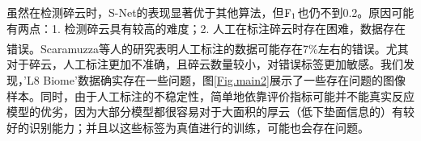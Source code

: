 \documentclass[10pt,UTF8,fntef]{ctexart}
\newcommand{\upcite}[1]{\textsuperscript{\textsuperscript{\cite{#1}}}}
\begin{document}
\begin{multicols}{2}

虽然在检测碎云时，S-Net的表现显著优于其他算法，但$\rm F_1$也仍不到0.2。原因可能有两点：1. 检测碎云具有较高的难度；2. 人工在标注碎云时存在困难，数据存在错误。Scaramuzza等人\upcite{scaramuzza2011development}的研究表明人工标注的数据可能存在7\%左右的错误。尤其对于碎云，人工标注更加不准确，且碎云数量较小，对错误标签更加敏感。我们发现，'L8 Biome'数据确实存在一些问题，图\ref{Fig.main2}展示了一些存在问题的图像样本。同时，由于人工标注的不稳定性，简单地依靠评价指标可能并不能真实反应模型的优劣，因为大部分模型都很容易对于大面积的厚云（低下垫面信息的）有较好的识别能力；并且以这些标签为真值进行的训练，可能也会存在问题。

\begin{figure}[H]
    \centering
\end{figure}
\end{multicols}
\end{document}
